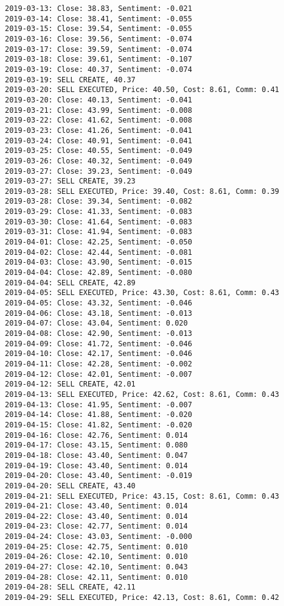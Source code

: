 \documentclass[11pt]{article}
\begin{document}
\begin{Verbatim}[commandchars=\\\{\}]
2019-03-13: Close: 38.83, Sentiment: -0.021
2019-03-14: Close: 38.41, Sentiment: -0.055
2019-03-15: Close: 39.54, Sentiment: -0.055
2019-03-16: Close: 39.56, Sentiment: -0.074
2019-03-17: Close: 39.59, Sentiment: -0.074
2019-03-18: Close: 39.61, Sentiment: -0.107
2019-03-19: Close: 40.37, Sentiment: -0.074
2019-03-19: SELL CREATE, 40.37
2019-03-20: SELL EXECUTED, Price: 40.50, Cost: 8.61, Comm: 0.41
2019-03-20: Close: 40.13, Sentiment: -0.041
2019-03-21: Close: 43.99, Sentiment: -0.008
2019-03-22: Close: 41.62, Sentiment: -0.008
2019-03-23: Close: 41.26, Sentiment: -0.041
2019-03-24: Close: 40.91, Sentiment: -0.041
2019-03-25: Close: 40.55, Sentiment: -0.049
2019-03-26: Close: 40.32, Sentiment: -0.049
2019-03-27: Close: 39.23, Sentiment: -0.049
2019-03-27: SELL CREATE, 39.23
2019-03-28: SELL EXECUTED, Price: 39.40, Cost: 8.61, Comm: 0.39
2019-03-28: Close: 39.34, Sentiment: -0.082
2019-03-29: Close: 41.33, Sentiment: -0.083
2019-03-30: Close: 41.64, Sentiment: -0.083
2019-03-31: Close: 41.94, Sentiment: -0.083
2019-04-01: Close: 42.25, Sentiment: -0.050
2019-04-02: Close: 42.44, Sentiment: -0.081
2019-04-03: Close: 43.90, Sentiment: -0.015
2019-04-04: Close: 42.89, Sentiment: -0.080
2019-04-04: SELL CREATE, 42.89
2019-04-05: SELL EXECUTED, Price: 43.30, Cost: 8.61, Comm: 0.43
2019-04-05: Close: 43.32, Sentiment: -0.046
2019-04-06: Close: 43.18, Sentiment: -0.013
2019-04-07: Close: 43.04, Sentiment: 0.020
2019-04-08: Close: 42.90, Sentiment: -0.013
2019-04-09: Close: 41.72, Sentiment: -0.046
2019-04-10: Close: 42.17, Sentiment: -0.046
2019-04-11: Close: 42.28, Sentiment: -0.002
2019-04-12: Close: 42.01, Sentiment: -0.007
2019-04-12: SELL CREATE, 42.01
2019-04-13: SELL EXECUTED, Price: 42.62, Cost: 8.61, Comm: 0.43
2019-04-13: Close: 41.95, Sentiment: -0.007
2019-04-14: Close: 41.88, Sentiment: -0.020
2019-04-15: Close: 41.82, Sentiment: -0.020
2019-04-16: Close: 42.76, Sentiment: 0.014
2019-04-17: Close: 43.15, Sentiment: 0.080
2019-04-18: Close: 43.40, Sentiment: 0.047
2019-04-19: Close: 43.40, Sentiment: 0.014
2019-04-20: Close: 43.40, Sentiment: -0.019
2019-04-20: SELL CREATE, 43.40
2019-04-21: SELL EXECUTED, Price: 43.15, Cost: 8.61, Comm: 0.43
2019-04-21: Close: 43.40, Sentiment: 0.014
2019-04-22: Close: 43.40, Sentiment: 0.014
2019-04-23: Close: 42.77, Sentiment: 0.014
2019-04-24: Close: 43.03, Sentiment: -0.000
2019-04-25: Close: 42.75, Sentiment: 0.010
2019-04-26: Close: 42.10, Sentiment: 0.010
2019-04-27: Close: 42.10, Sentiment: 0.043
2019-04-28: Close: 42.11, Sentiment: 0.010
2019-04-28: SELL CREATE, 42.11
2019-04-29: SELL EXECUTED, Price: 42.13, Cost: 8.61, Comm: 0.42

\end{Verbatim}
\end{document}
